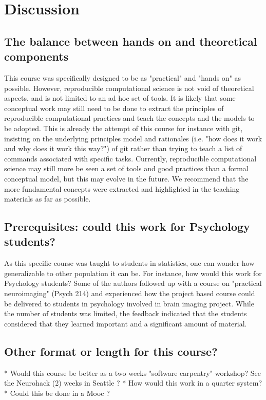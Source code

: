 \section{Discussion}\label{discussion}

\subsection*{The balance between hands on and theoretical components}
This course was specifically designed to be as "practical" and "hands on" as
possible. However, reproducible computational science is not void of
theoretical aspects, and is not limited to an ad hoc set of tools. It is likely
that some conceptual work may still need to be done to extract the principles
of reproducible computational practices and teach the concepts and the models
to be adopted. This is already the attempt of this course for instance with
git, insisting on the underlying principles model and rationales (i.e. "how
does it work and why does it work this way?") of git rather than trying to
teach a list of commands associated with specific tasks. Currently,
reproducible computational science may still more be seen a set of tools and
good practices than a formal conceptual model, but this may evolve in the
future. We recommend that the more fundamental concepts were extracted and
highlighted in the teaching materials as far as possible. 

\subsection*{Prerequisites: could this work for Psychology students?}
As this specific course was taught to students in statistics, one can wonder
how generalizable to other population it can be. For instance, how would this
work for Psychology students? Some of the authors followed up with a course on
"practical neuroimaging" (Psych 214) and experienced how the project based
course could be delivered to students in psychology involved in brain imaging
project. While the number of students was limited, the feedback indicated that
the students considered that they learned important and a significant amount of
material.

\subsection*{Other format or length for this course?}
* Would this course be better as a two weeks "software carpentry" workshop? See the Neurohack (2) weeks in Seattle ?
* How would this work in a quarter system?
* Could this be done in a Mooc ? 

